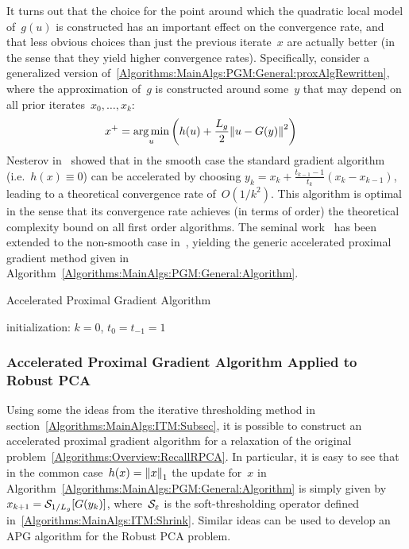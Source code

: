 \documentclass{../../common/projectreport}
\begin{document}
It turns out that the choice for the point around which the quadratic local model of~$g(u)$ is constructed has an important effect on the convergence rate, and that less obvious choices than just the previous iterate~$x$ are actually better (in the sense that they yield higher convergence rates). Specifically, consider a generalized version of~\eqref{Algorithms:MainAlgs:PGM:General:proxAlgRewritten}, where the approximation of~$g$ is constructed around some~$y$ that may depend on all prior iterates~$x_0,\dotsc,x_k$:
%
\begin{align}
x^+ &= \operatorname*{arg\,min}_u \left( h(u) +\frac{L_g}{2} {\left\|u-G(y)\right\|}_{}^{2} \right)
\label{Algorithms:MainAlgs:PGM:General:proxAlgGeneralized}
\end{align}
%
Nesterov in~\cite{Nesterov:1983uq} showed that in the smooth case the standard gradient algorithm (i.e.~$h(x) \equiv 0$) can be accelerated by choosing $y_k = x_k + \frac{t_{k-1}-1}{t_k}(x_k-x_{k-1})$, leading to a theoretical convergence rate of~$O(1/k^2)$. This algorithm is optimal in the sense that its convergence rate achieves (in terms of order) the theoretical complexity bound on all first order algorithms. The seminal work~\cite{Nesterov:1983uq} has been extended to the non-smooth case in~\cite{Beck:2009kx,Nesterov:2007kx}, yielding the generic accelerated proximal gradient method given in Algorithm~\ref{Algorithms:MainAlgs:PGM:General:Algorithm}.
%
\begin{algorithm}
\caption{Accelerated Proximal Gradient Algorithm}
initialization: $k=0$, $t_0=t_{-1} = 1$\;
\label{Algorithms:MainAlgs:PGM:General:Algorithm}
\end{algorithm}



\subsubsection{Accelerated Proximal Gradient Algorithm Applied to Robust PCA}
\label{Algorithms:MainAlgs:PGM:APGRPCA:Subsubsec}

Using some the ideas from the iterative thresholding method in section~\ref{Algorithms:MainAlgs:ITM:Subsec}, it is possible to construct an accelerated proximal gradient algorithm for a relaxation of the original problem~\eqref{Algorithms:Overview:RecallRPCA}. In particular, it is easy to see that in the common case~$h(x) = {\left\|x\right\|}_{1}^{}$ the update for~$x$ in Algorithm~\ref{Algorithms:MainAlgs:PGM:General:Algorithm} is simply given by $x_{k+1} = {\mathcal{S}}_{1/L_g}[G(y_k)]$, where~${\mathcal{S}}_\varepsilon$ is the soft-thresholding operator defined in~\eqref{Algorithms:MainAlgs:ITM:Shrink}. Similar ideas can be used to develop an APG algorithm for the Robust PCA problem. 
\end{document}
